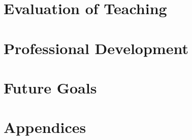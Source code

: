 \documentclass{article}
\begin{document}
\section{Evaluation of Teaching}

\section{Professional Development}

\section{Future Goals}


\appendix
\section*{Appendices}
\section{}
\end{document}
